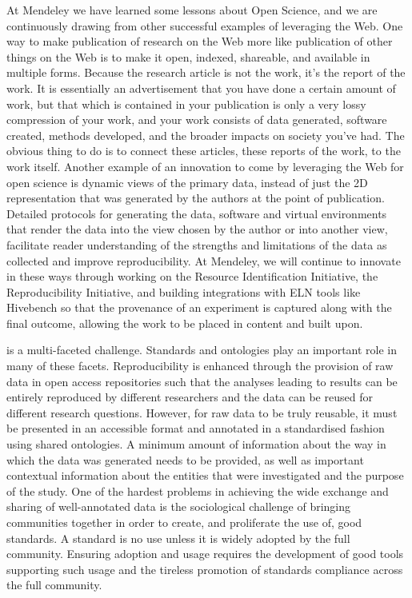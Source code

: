 \documentclass[a4paper,UKenglish]{dagrep}
\begin{document}
At Mendeley we have learned some lessons about Open Science, and we are
continuously drawing from other successful examples of leveraging the Web. One
way to make publication of research on the Web more like publication of other
things on the Web is to make it open, indexed, shareable, and available in
multiple forms. Because the research article is not the work, it's the report of
the work. It is essentially an advertisement that you have done a certain amount
of work, but that which is contained in your publication is only a very lossy
compression of your work, and your work consists of data generated, software
created, methods developed, and the broader impacts on society you've had. The
obvious thing to do is to connect these articles, these reports of the work, to
the work itself. Another example of an innovation to come by leveraging the Web
for open science is dynamic views of the primary data, instead of just the 2D
representation that was generated by the authors at the point of publication.
Detailed protocols for generating the data, software and virtual environments
that render the data into the view chosen by the author or into another view,
facilitate reader understanding of the strengths and limitations of the data as
collected and improve reproducibility. At Mendeley, we will continue to innovate
in these ways through working on the Resource Identification Initiative, the
Reproducibility Initiative, and building integrations with ELN tools like
Hivebench so that the provenance of an experiment is captured along with the
final outcome, allowing the work to be placed in content and built upon.
 


{}
\license
 is a multi-faceted challenge. Standards and ontologies play an important role
in many of these facets. Reproducibility is enhanced through the provision of
raw data in open access repositories such that the analyses leading to results
can be entirely reproduced by different researchers and the data can be reused
for different research questions. However, for raw data to be truly reusable, it
must be presented in an accessible format and annotated in a standardised
fashion using shared ontologies. A minimum amount of information about the way
in which the data was generated needs to be provided, as well as important
contextual information about the entities that were investigated and the purpose
of the study. One of the hardest problems in achieving the wide exchange and
sharing of well-annotated data is the sociological challenge of bringing
communities together in order to create, and proliferate the use of, good
standards. A standard is no use unless it is widely adopted by the full
community. Ensuring adoption and usage requires the development of good tools
supporting such usage and the tireless promotion of standards compliance across
the full community. 
\end{document}
